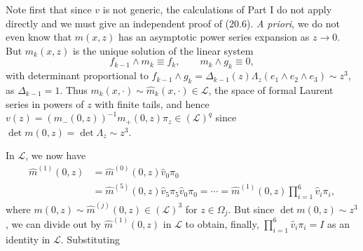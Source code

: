 \documentclass{surv-l}
\theoremstyle{plain}
\theoremstyle{definition}
\numberwithin{equation}{chapter}
\begin{document}
Note first that since $v$ is not generic, the calculations of Part I do not apply directly and we must give an independent proof of (20.6). \emph{A priori}, we do not even know that $m(x, z)$ has an asymptotic power series expansion as $z\rightarrow 0$. But $m_{k}(x, z)$ is the unique solution of the linear system
\renewcommand\theequation{7.\arabic{equation}}
\setcounter{equation}{20}
\begin{equation}
f_{k-1}\wedge m_{k}\equiv f_{k},\qquad  m_{k}\wedge g_{k}\equiv 0,
\end{equation}
with determinant proportional to $f_{k-1}\wedge g_{k}=\Delta_{k-1}(z)\Lambda_{z}(e_{1}\wedge e_{2}\wedge e_{3})\sim z^{3}$, as $\Delta_{k-1}=1$. Thus $m_{k}(x, \cdot)\sim\hat{m}_{k}(x, \cdot)\in \mathscr{L}$, the space of formal Laurent series in powers of $z$ with finite tails, and hence $v(z)=(m_{-} (0, z))^{-1}m_{+}(0, z)\pi_{z}\in(\mathscr{L})^{q}$ since $\det m(0,z)=\det\Lambda_{z}\sim z^{3}$.

In $\mathscr{L}$, we now have
\begin{align*}
\hat{m}^{(1)}(0, z)&=\hat{m}^{(0)}(0,z)\hat{v}_{0}\pi_{0}\\
&=\hat{m}^{(5)}(0, z)\hat{v}_{5}\pi_{5}\hat{v}_{0}\pi_{0}=\cdots =\hat{m}^{(1)}(0, z)\prod_{i=1}^{6}\hat{v}_{i}\pi_{i},
\end{align*}
where $m(0, z)\sim\hat{m}^{(j)}(0, z)\in(\mathscr{L})^{3}$ for $z\in\Omega_{j}$. But since $\det m(0, z)\sim z^{3}$, we can divide out by $\hat{m}^{(1)}(0,z)$ in $\mathscr{L}$ to obtain, finally, $\prod_{i=1}^{6}\hat{v}_{i}\pi_{i}=I$ as an identity in $\mathscr{L}$. Substituting
\end{document}
